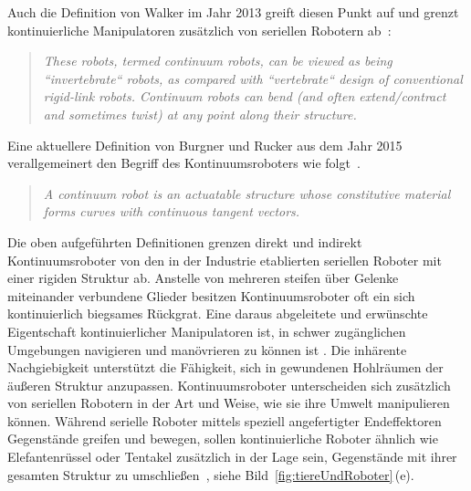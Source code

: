 Auch die Definition von Walker im Jahr 2013 greift diesen Punkt auf und grenzt kontinuierliche Manipulatoren zusätzlich von seriellen Robotern ab~\cite{Wal13}:

\begin{quotation}
\textit{These robots, termed continuum robots, can be viewed as being ``invertebrate`` robots, as compared with ``vertebrate`` design of conventional rigid-link robots. Continuum robots can bend (and often extend/contract and sometimes twist) at any point along their structure.}
\end{quotation}


Eine aktuellere Definition von Burgner und Rucker aus dem Jahr 2015 verallgemeinert den Begriff des Kontinuumsroboters wie folgt~\cite{BRC15}. 

\begin{quotation}
\textit{A continuum robot is an actuatable structure whose constitutive material forms curves with continuous tangent vectors.}
\end{quotation}

Die oben aufgeführten Definitionen grenzen direkt und indirekt Kontinuumsroboter von den in der Industrie etablierten seriellen Roboter mit einer rigiden Struktur ab. Anstelle von mehreren steifen über Gelenke miteinander verbundene Glieder besitzen Kontinuumsroboter oft ein sich kontinuierlich biegsames Rückgrat. Eine daraus abgeleitete und erwünschte Eigentschaft kontinuierlicher Manipulatoren ist, in schwer zugänglichen Umgebungen navigieren und manövrieren zu können ist . Die inhärente Nachgiebigkeit unterstützt die Fähigkeit, sich in gewundenen Hohlräumen der äußeren Struktur anzupassen. Kontinuumsroboter unterscheiden sich zusätzlich von seriellen Robotern in der Art und Weise, wie sie ihre Umwelt manipulieren können. Während serielle Roboter mittels speziell angefertigter Endeffektoren Gegenstände greifen und bewegen, sollen kontinuierliche Roboter ähnlich wie Elefantenrüssel oder Tentakel zusätzlich in der Lage sein, Gegenstände mit ihrer gesamten Struktur zu umschließen~\cite{Moc01}, siehe Bild~\ref{fig:tiereUndRoboter}\,(e).

